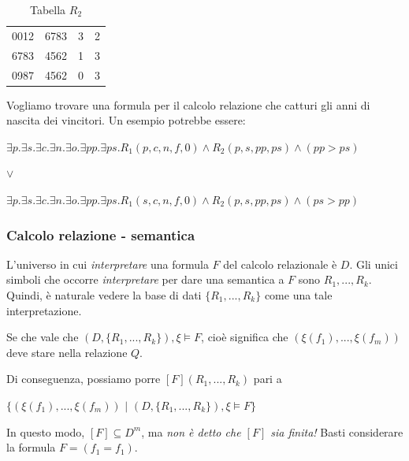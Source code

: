 \documentclass{article}
\begin{document}
\begin{table}[!ht]
    \centering
    \begin{tabular}{|cccc|}
    \hline \hline
        0012 & 6783 & 3 & 2 \\
        6783 & 4562 & 1 & 3 \\
        0987 & 4562 & 0 & 3 \\
        \hline\hline
    \end{tabular}
    \caption{Tabella $R_2$}
    \label{tab:r2}
\end{table}

Vogliamo trovare una formula per il calcolo relazione che catturi gli anni di nascita dei vincitori. Un esempio potrebbe essere:

\begin{center}
\noindent $\exists p.\exists s.\exists c.\exists n.\exists o.\exists pp.\exists ps.R_1(p,c,n,f,0)\land R_2(p,s,pp,ps)\land(pp>ps)$
\end{center}

\begin{center}
    $\lor$
\end{center}

\begin{center}
\noindent$\exists p.\exists s.\exists c.\exists n.\exists o.\exists pp.\exists ps.R_1(s,c,n,f,0)\land R_2(p,s,pp,ps)\land(ps>pp)$
\end{center}

\subsubsection{Calcolo relazione - semantica}
L'universo in cui \textit{interpretare} una formula $F$ del calcolo relazionale è $D$. Gli unici simboli che occorre \textit{interpretare} per dare una semantica a $F$ sono $R_1,...,R_k$. Quindi, è naturale vedere la base di dati $\{R_1,...,R_k\}$ come una tale interpretazione.

\bigskip

Se che vale che $(D,\{R_1,...,R_k\}),\xi\vDash F$, cioè significa che $(\xi(f_1),...,\xi(f_m))$ deve stare nella relazione $Q$.

\bigskip

Di conseguenza, possiamo porre $[F](R_1,...,R_k)$ pari a 

$\{(\xi(f_1),...,\xi(f_m))\,\,|\,\,(D,\{R_1,...,R_k\}),\xi\vDash F\}$

\bigskip

In questo modo, $[F]\subseteq D^m$, ma \textit{non è detto che $[F]$ sia finita!} Basti considerare la formula $F=(f_1=f_1)$.
\end{document}
